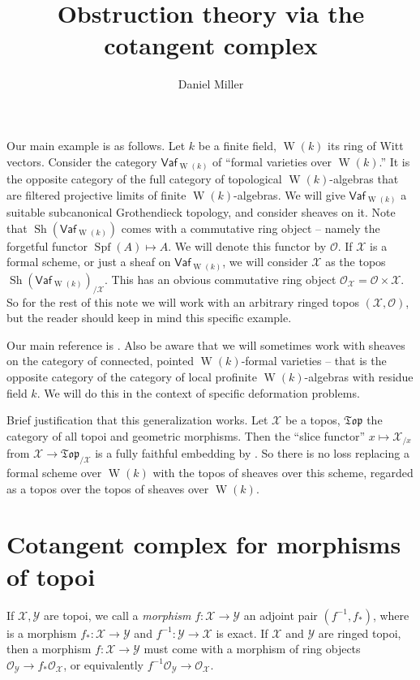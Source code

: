 \documentclass{article}
\title{Obstruction theory via the cotangent complex}
\author{Daniel Miller}
\DeclareMathOperator{\sheaves}{Sh}
\DeclareMathOperator{\spf}{Spf}
\DeclareMathOperator{\witt}{W}
\newcommand{\cX}{\mathcal{X}}
\newcommand{\cY}{\mathcal{Y}}
\newcommand{\sO}{\mathscr{O}}
\newcommand{\vaf}{\mathsf{Vaf}}
\begin{document}
\maketitle





Our main example is as follows. Let $k$ be a finite field, $\witt(k)$ its ring 
of Witt vectors. Consider the category $\vaf_{\witt(k)}$ of ``formal varieties 
over $\witt(k)$.'' It is the opposite category of the full category of 
topological $\witt(k)$-algebras that are filtered projective limits of finite 
$\witt(k)$-algebras. We will give $\vaf_{\witt(k)}$ a suitable subcanonical 
Grothendieck topology, and consider sheaves on it. Note that 
$\sheaves(\vaf_{\witt(k)})$ comes with a commutative ring object -- namely the 
forgetful functor $\spf(A)\mapsto A$. We will denote this functor by $\sO$. 
If $\cX$ is a formal scheme, or just a sheaf on $\vaf_{\witt(k)}$, we will 
consider $\cX$ as the topos $\sheaves\left(\vaf_{\witt(k)}\right)_{/\cX}$. 
This has an obvious commutative ring object $\sO_\cX=\sO\times \cX$. So for the 
rest of this note we will work with an arbitrary ringed topos $(\cX,\sO)$, but 
the reader should keep in mind this specific example. 

Our main reference is \cite{illusie-1971}. Also be aware that we will sometimes 
work with sheaves on the category of connected, pointed $\witt(k)$-formal 
varieties -- that is the opposite category of the category of local profinite 
$\witt(k)$-algebras with residue field $k$. We will do this in the context of 
specific deformation problems. 

Brief justification that this generalization works. Let $\cX$ be a topos, 
$\mathfrak{Top}$ the category of all topoi and geometric morphisms. Then the 
``slice functor'' $x\mapsto \cX_{/x}$ from $\cX\to\mathfrak{Top}_{/\cX}$ is 
a fully faithful embedding by \cite[4.38]{johnstone-1977}. So there is no 
loss replacing a formal scheme over $\witt(k)$ with the topos of sheaves over 
this scheme, regarded as a topos over the topos of sheaves over $\witt(k)$. 





\section{Cotangent complex for morphisms of topoi}

If $\cX,\cY$ are topoi, we call a \emph{morphism} $f:\cX\to \cY$ an adjoint 
pair $(f^{-1},f_\ast)$, where is a morphism $f_\ast:\cX\to \cY$ and 
$f^{-1}:\cY\to \cX$ is exact. If $\cX$ and $\cY$ are ringed topoi, then a 
morphism $f:\cX\to \cY$ must come with a morphism of ring objects 
$\sO_\cY\to f_\ast \sO_\cX$, or equivalently $f^{-1} \sO_\cY\to \sO_\cX$. 
\end{document}
